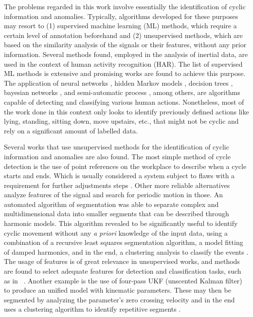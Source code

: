 The problems regarded in this work involve essentially the identification of cyclic information and anomalies. Typically, algorithms developed for these purposes may resort to (1) supervised machine learning (ML) methods, which require a certain level of annotation beforehand and (2) unsupervised methods, which are based on the similarity analysis of the signals or their features, without any prior information. 
Several methods found, employed in the analysis of inertial data, are used in the context of human activity recognition (HAR). The list of supervised ML methods is extensive and promising works are found to achieve this purpose. The application of neural networks \cite{Lara2013}, hidden Markov models \cite{Zhu2009}, decision trees \cite{Jatoba2008}, bayesian networks \cite{Jatoba2008}, and semi-automatic process \cite{duarte1}, among others, are algorithms capable of detecting and classifying various human actions. Nonetheless, most of the work done in this context only looks to identify previously defined actions like lying, standing, sitting down, move upstairs, etc., that might not be cyclic and rely on a significant amount of labelled data.
\par
Several works that use unsupervised methods for the identification of cyclic information and anomalies are also found. The most simple method of cycle detection is the use of point references on the workplace to describe when a cycle starts and ends. Which is usually considered a system subject to flaws with a requirement for further adjustments steps \cite{Bauters2014,Bauters2018}.
Other more reliable alternatives analyze features of the signal and search for periodic motion in those. An automated algorithm of segmentation was able to separate complex and multidimensional data into smaller segments that can be described through harmonic models. This algorithm revealed to be significantly useful to identify cyclic movement without any \textit{a priori} knowledge of the input data, using a combination of a recursive least squares segmentation algorithm, a model fitting of damped harmonics, and in the end, a clustering analysis to classify the events \cite{Lu2004,Lu2003}. The usage of features is of great relevance in unsupervised works, and methods are found to select adequate features for detection and classification tasks, such as in ~\cite{machado2015}. Another example is the use of four-pass UKF (unscented Kalman filter) to produce an unified model with kinematic parameters. These may then be segmented by analyzing the parameter's zero crossing velocity and in the end uses a clustering algorithm to identify repetitive segments \cite{Wang2015a}.
